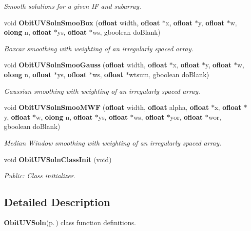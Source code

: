 \begin{CompactItemize}
\begin{CompactList}\small\item\em Smooth solutions for a given IF and subarray. \item\end{CompactList}\item 
void {\bf Obit\-UVSoln\-Smoo\-Box} ({\bf ofloat} width, {\bf ofloat} $\ast$x, {\bf ofloat} $\ast$y, {\bf ofloat} $\ast$w, {\bf olong} n, {\bf ofloat} $\ast$ys, {\bf ofloat} $\ast$ws, gboolean do\-Blank)
\begin{CompactList}\small\item\em Boxcar smoothing with weighting of an irregularly spaced array. \item\end{CompactList}\item 
void {\bf Obit\-UVSoln\-Smoo\-Gauss} ({\bf ofloat} width, {\bf ofloat} $\ast$x, {\bf ofloat} $\ast$y, {\bf ofloat} $\ast$w, {\bf olong} n, {\bf ofloat} $\ast$ys, {\bf ofloat} $\ast$ws, {\bf ofloat} $\ast$wtsum, gboolean do\-Blank)
\begin{CompactList}\small\item\em Gaussian smoothing with weighting of an irregularly spaced array. \item\end{CompactList}\item 
void {\bf Obit\-UVSoln\-Smoo\-MWF} ({\bf ofloat} width, {\bf ofloat} alpha, {\bf ofloat} $\ast$x, {\bf ofloat} $\ast$y, {\bf ofloat} $\ast$w, {\bf olong} n, {\bf ofloat} $\ast$ys, {\bf ofloat} $\ast$ws, {\bf ofloat} $\ast$yor, {\bf ofloat} $\ast$wor, gboolean do\-Blank)
\begin{CompactList}\small\item\em Median Window smoothing with weighting of an irregularly spaced array. \item\end{CompactList}\item 
void {\bf Obit\-UVSoln\-Class\-Init} (void)
\begin{CompactList}\small\item\em Public: Class initializer. \item\end{CompactList}\end{CompactItemize}


\subsection{Detailed Description}
{\bf Obit\-UVSoln}{\rm (p.\,\pageref{structObitUVSoln})} class function definitions. 

